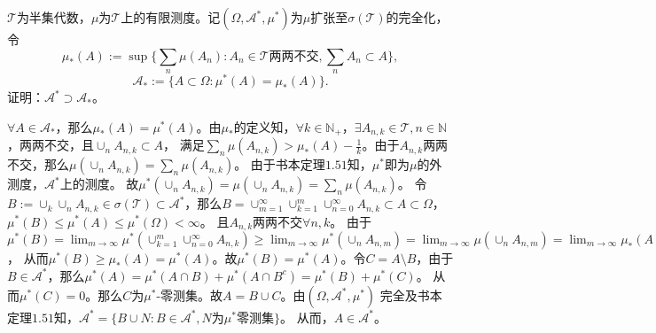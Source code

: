 \documentclass{ctexart}
\begin{document}
\begin{problem}\label{pro:22}
  \(\mathcal{T} \)为半集代数，\(\mu \)为\(\mathcal{T} \)上的有限测度。记\((\Omega,\mathcal{A}^*,\mu^*) \)为\(\mu \)扩张至\(\sigma(\mathcal{T}) \)的完全化，令 
  \[
    \mu_*(A):=\sup \{\sum_{n}\mu(A_n):A_n \in \mathcal{T} \text{两两不交},\sum_{n}A_n \subset A\},
  \]
  \[
    \mathcal{A}_*:=\{A \subset \Omega:\mu^*(A)=\mu_*(A)\}.
  \]
  证明：\(\mathcal{A}^* \supset \mathcal{A}_* \)。
\end{problem}
\begin{solution}
  \(\forall A \in \mathcal{A}_* \)，那么\(\mu_*(A)=\mu^*(A) \)。由\(\mu_* \)的定义知，\(\forall k \in \mathbb{N}_{+} \)，\(\exists A_{n,k} \in \mathcal{T} , n \in \mathbb{N}\)，两两不交，且\(\cup_n A_{n,k} \subset A \)，
  满足\(\sum_{n}\mu(A_{n,k}) > \mu_*(A)-\frac{1}{k} \)。由于\(A_{n,k} \)两两不交，那么\(\mu(\cup_n A_{n,k})=\sum_{n}\mu(A_{n,k}) \)。
  由于书本定理\(1.51 \)知，\(\mu^* \)即为\(\mu \)的外测度，\(\mathcal{A}^* \)上的测度。
  故\(\mu^*(\cup_n A_{n,k})=\mu(\cup_n A_{n,k})=\sum_{n}\mu(A_{n,k}) \)。
  令\(B:= \cup_k \cup_n A_{n,k} \in \sigma(\mathcal{T}) \subset \mathcal{A}^*\)，那么\(B= \cup_{m=1}^{\infty} \cup_{k=1}^{m} \cup_{n=0}^{\infty}A_{n,k} \subset A \subset \Omega\)，\(\mu^*(B) \leq \mu^*(A) \leq \mu^*(\Omega)<\infty \)。
  且\(A_{n,k} \)两两不交\(\forall n,k \)。
  由于\(\mu^*(B)=\lim_{m \to \infty }\mu^*(\cup_{k=1}^m \cup_{n=0}^{\infty}A_{n,k}) \geq \lim_{m \to \infty} \mu^*(\cup_n A_{n,m})=\lim_{m \to \infty}\mu(\cup_n A_{n,m})=\lim_{m \to \infty} \mu_*(A)-\frac{1}{m}=\mu_*(A)\)，
  从而\(\mu^*(B) \geq \mu_*(A)=\mu^*(A) \)。故\(\mu^*(B)=\mu^*(A) \)。令\(C=A\setminus B \)，由于\(B \in \mathcal{A}^* \)，那么\(\mu^*(A)=\mu^*(A \cap B) + \mu^*(A \cap B^c)=\mu^*(B) + \mu^*(C) \)。
  从而\(\mu^*(C)=0 \)。那么\(C \)为\(\mu^* \)-零测集。故\(A=B \cup C \)。由\((\Omega,\mathcal{A}^*,\mu^*) \) 完全及书本定理\(1.51 \)知，\(\mathcal{A}^*=\{B \cup N: B \in \mathcal{A}^*,N \text{为}\mu^* \text{零测集} \} \)。
  从而，\(A \in \mathcal{A}^* \)。

\end{solution}
\end{document}
